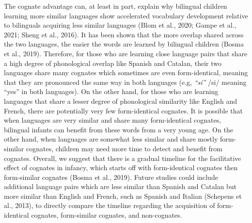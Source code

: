 \documentclass[
  english,
  ,man,floatsintext]{apa6}
\begin{document}
The cognate advantage can, at least in part, explain why bilingual children learning more similar languages show accelerated vocabulary development relative to bilinguals acquiring less similar languages (Blom et al., 2020; Gampe et al., 2021; Sheng et al., 2016). It has been shown that the more overlap shared across the two languages, the easier the words are learned by bilingual children (Bosma et al., 2019). Therefore, for those who are learning close language pairs that share a high degree of phonological overlap like Spanish and Catalan, their two languages share many cognates which sometimes are even form-identical, meaning that they are pronounced the same way in both languages (e.g, \emph{``sí''} /si/ meaning ``yes'' in both languages). On the other hand, for those who are learning languages that share a lesser degree of phonological similarity like English and French, there are potentially very few form-identical cognates. It is possible that when languages are very similar and share many form-identical cognates, bilingual infants can benefit from these words from a very young age. On the other hand, when languages are somewhat less similar and share mostly form-similar cognates, children may need more time to detect and benefit from cognates. Overall, we suggest that there is a gradual timeline for the facilitative effect of cognates in infancy, which starts off with form-identical cognates then form-similar cognates (Bosma et al., 2019). Future studies could include additional language pairs which are less similar than Spanish and Catalan but more similar than English and French, such as Spanish and Italian (Schepens et al., 2013), to directly compare the timeline regarding the acquisition of form-identical cognates, form-similar cognates, and non-cognates.
\end{document}

